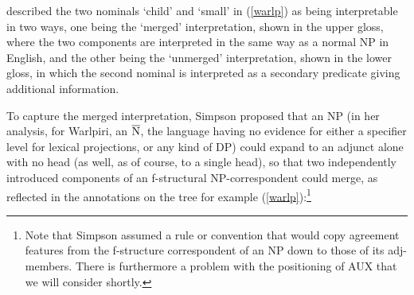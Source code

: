 \documentclass[output=paper,hidelinks]{langscibook}
\begin{document}
\citet{Hale81} described the two nominals `child' and `small' in
(\ref{warlp}) as being interpretable
in two ways, one being the `merged' interpretation, shown in the upper gloss,
where the two components are interpreted in the same way as a normal NP in
English, and the other being the `unmerged' interpretation, shown in the lower gloss, in which
the second nominal is interpreted as a secondary predicate giving additional
information.

To capture the merged interpretation, Simpson proposed that an NP (in her analysis,
for Warlpiri, an $\overline{\hbox{N}}$, the language having no evidence for either a specifier
level for lexical projections, or any kind of DP) could expand
to an adjunct alone with no head (as well, as of course, to a single head), so
that two independently introduced components of an f-structural
NP-correspondent could merge, as reflected in the annotations on the tree for
example (\ref{warlp}):\footnote
 {Note that Simpson assumed a rule or convention that would copy agreement features from
 the f-structure correspondent of an NP down to those of its {\sc adj}-members. There
 is furthermore a problem with the positioning of AUX that we will consider shortly.}
  
\end{document}
